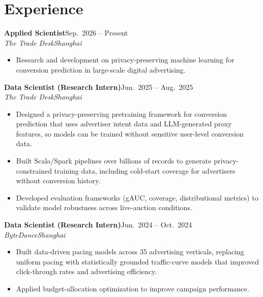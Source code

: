 \documentclass[letterpaper,11pt]{article}
\newcommand{\entry}[4]{\par\vspace{2pt}\hspace*{0.8em}\textbf{#1}\hfill #2\\\hspace*{0.8em}\textit{#3}\hfill\textit{#4}\par}
\begin{document}
\section*{Experience}
\entry{Applied Scientist}{Sep.\ 2026 -- Present}{The Trade Desk}{Shanghai}
\begin{itemize}
  \item Research and development on privacy-preserving machine learning for conversion prediction in large-scale digital advertising.
\end{itemize}
\entry{Data Scientist (Research Intern)}{Jun.\ 2025 -- Aug.\ 2025}{The Trade Desk}{Shanghai}
\begin{itemize}
  \item Designed a privacy-preserving pretraining framework for conversion prediction that uses advertiser intent data and LLM-generated proxy features, so models can be trained without sensitive user-level conversion data.
  \item Built Scala/Spark pipelines over billions of records to generate privacy-constrained training data, including cold-start coverage for advertisers without conversion history.
  \item Developed evaluation frameworks (gAUC, coverage, distributional metrics) to validate model robustness across live-auction conditions.
\end{itemize}
\entry{Data Scientist (Research Intern)}{Jun.\ 2024 -- Oct.\ 2024}{ByteDance}{Shanghai}
\begin{itemize}
  \item Built data-driven pacing models across 35 advertising verticals, replacing uniform pacing with statistically grounded traffic-curve models that improved click-through rates and advertising efficiency.
  \item Applied budget-allocation optimization to improve campaign performance.
\end{itemize}
\end{document}
